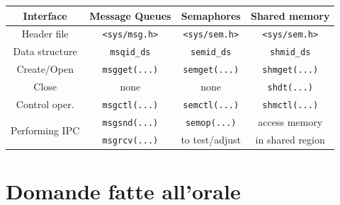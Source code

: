 \documentclass[a4paper, 12pt]{book}
\begin{document}
    \begin{center}
        \begin{tabular}{|c|c|c|c|}
            \hline 
            Interface & Message Queues & Semaphores & Shared memory \\
            \hline 
            Header file & \verb|<sys/msg.h>| & \verb|<sys/sem.h>| & \verb|<sys/sem.h>| \\
            Data structure & \verb|msqid_ds| & \verb|semid_ds| & \verb|shmid_ds| \\
            Create/Open & \verb|msgget(...)| & \verb|semget(...)| & \verb|shmget(...)| \\
            Close & none & none & \verb|shdt(...)| \\
            Control oper. & \verb|msgctl(...)| & \verb|semctl(...)| & \verb|shmctl(...)| \\
            \multirow{2}{4em}{Performing IPC} & \verb|msgsnd(...)| & \verb|semop(...)| & access memory \\
            & \verb|msgrcv(...)| & to test/adjust & in shared region \\
            \hline
        \end{tabular}    
    \end{center}
    

    
    








    



    
    







    


     

    \chapter{Domande fatte all'orale}
\end{document}
